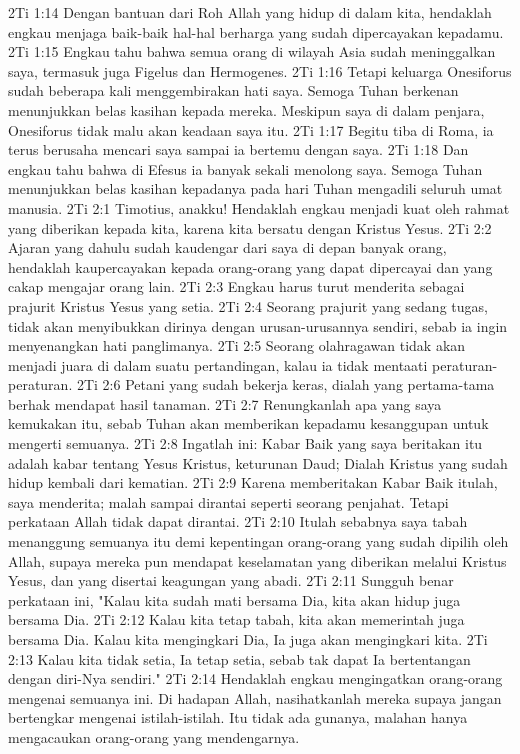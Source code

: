 2Ti 1:14  Dengan bantuan dari Roh Allah yang hidup di dalam kita, hendaklah engkau menjaga baik-baik hal-hal berharga yang sudah dipercayakan kepadamu.
2Ti 1:15  Engkau tahu bahwa semua orang di wilayah Asia sudah meninggalkan saya, termasuk juga Figelus dan Hermogenes.
2Ti 1:16  Tetapi keluarga Onesiforus sudah beberapa kali menggembirakan hati saya. Semoga Tuhan berkenan menunjukkan belas kasihan kepada mereka. Meskipun saya di dalam penjara, Onesiforus tidak malu akan keadaan saya itu.
2Ti 1:17  Begitu tiba di Roma, ia terus berusaha mencari saya sampai ia bertemu dengan saya.
2Ti 1:18  Dan engkau tahu bahwa di Efesus ia banyak sekali menolong saya. Semoga Tuhan menunjukkan belas kasihan kepadanya pada hari Tuhan mengadili seluruh umat manusia.
2Ti 2:1  Timotius, anakku! Hendaklah engkau menjadi kuat oleh rahmat yang diberikan kepada kita, karena kita bersatu dengan Kristus Yesus.
2Ti 2:2  Ajaran yang dahulu sudah kaudengar dari saya di depan banyak orang, hendaklah kaupercayakan kepada orang-orang yang dapat dipercayai dan yang cakap mengajar orang lain.
2Ti 2:3  Engkau harus turut menderita sebagai prajurit Kristus Yesus yang setia.
2Ti 2:4  Seorang prajurit yang sedang tugas, tidak akan menyibukkan dirinya dengan urusan-urusannya sendiri, sebab ia ingin menyenangkan hati panglimanya.
2Ti 2:5  Seorang olahragawan tidak akan menjadi juara di dalam suatu pertandingan, kalau ia tidak mentaati peraturan-peraturan.
2Ti 2:6  Petani yang sudah bekerja keras, dialah yang pertama-tama berhak mendapat hasil tanaman.
2Ti 2:7  Renungkanlah apa yang saya kemukakan itu, sebab Tuhan akan memberikan kepadamu kesanggupan untuk mengerti semuanya.
2Ti 2:8  Ingatlah ini: Kabar Baik yang saya beritakan itu adalah kabar tentang Yesus Kristus, keturunan Daud; Dialah Kristus yang sudah hidup kembali dari kematian.
2Ti 2:9  Karena memberitakan Kabar Baik itulah, saya menderita; malah sampai dirantai seperti seorang penjahat. Tetapi perkataan Allah tidak dapat dirantai.
2Ti 2:10  Itulah sebabnya saya tabah menanggung semuanya itu demi kepentingan orang-orang yang sudah dipilih oleh Allah, supaya mereka pun mendapat keselamatan yang diberikan melalui Kristus Yesus, dan yang disertai keagungan yang abadi.
2Ti 2:11  Sungguh benar perkataan ini, "Kalau kita sudah mati bersama Dia, kita akan hidup juga bersama Dia.
2Ti 2:12  Kalau kita tetap tabah, kita akan memerintah juga bersama Dia. Kalau kita mengingkari Dia, Ia juga akan mengingkari kita.
2Ti 2:13  Kalau kita tidak setia, Ia tetap setia, sebab tak dapat Ia bertentangan dengan diri-Nya sendiri."
2Ti 2:14  Hendaklah engkau mengingatkan orang-orang mengenai semuanya ini. Di hadapan Allah, nasihatkanlah mereka supaya jangan bertengkar mengenai istilah-istilah. Itu tidak ada gunanya, malahan hanya mengacaukan orang-orang yang mendengarnya.
